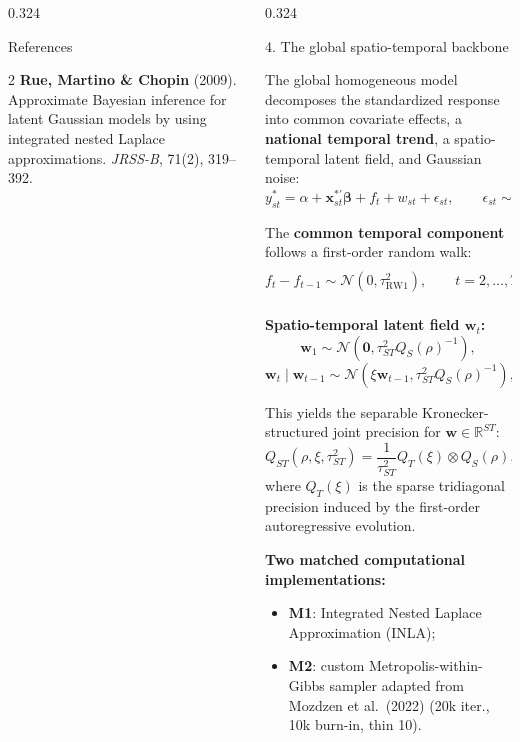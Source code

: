 \documentclass[final]{beamer}
\newcommand{\model}[1]{\textbf{#1}}
\newcommand{\microgap}{\vspace{0.12cm}}
\begin{document}
\begin{frame}[t]
\begin{columns}[t,totalwidth=\textwidth]
\begin{column}{0.324\textwidth}
\begin{block}{References}
\begin{multicols}{2}
\textbf{Rue, Martino \& Chopin} (2009).
Approximate Bayesian inference for latent Gaussian models by using
integrated nested Laplace approximations.
\textit{JRSS-B}, 71(2), 319--392.

\end{multicols}

\end{block}

\end{column}

\begin{column}{0.324\textwidth}
\begin{block}{4. The global spatio-temporal backbone}

The global homogeneous model decomposes the standardized response into
common covariate effects, a \textbf{national temporal trend}, a
spatio-temporal latent field, and Gaussian noise:
\[
y_{st}^*
=
\alpha
+
\mathbf{x}_{st}^{*\prime}\bm{\beta}
+
f_t
+
w_{st}
+
\epsilon_{st},
\qquad
\epsilon_{st}\sim\mathcal{N}(0,\sigma_\epsilon^2).
\]

The \textbf{common temporal component} follows a first-order random walk:
\[
f_t-f_{t-1}
\sim
\mathcal{N}(0,\tau_{\mathrm{RW1}}^2),
\qquad t=2,\ldots,T,
\qquad
\sum_{t=1}^{T}f_t=0.
\]

\microgap
\textbf{Spatio-temporal latent field $\mathbf{w}_t$:}
\[
\mathbf{w}_1
\sim
\mathcal{N}\!\left(
\mathbf{0},
\tau_{ST}^2Q_S(\rho)^{-1}
\right),
\]
\[
\mathbf{w}_t\mid\mathbf{w}_{t-1}
\sim
\mathcal{N}\!\left(
\xi\mathbf{w}_{t-1},
\tau_{ST}^2Q_S(\rho)^{-1}
\right),
\qquad t=2,\ldots,T.
\]

This yields the separable Kronecker-structured joint precision for
$\mathbf{w}\in\mathbb{R}^{ST}$:
\[
Q_{ST}(\rho,\xi,\tau_{ST}^2)
=
\frac{1}{\tau_{ST}^2}
Q_T(\xi)\otimes Q_S(\rho),
\]
where $Q_T(\xi)$ is the sparse tridiagonal precision induced by the first-order autoregressive evolution.


\vspace{0.5cm}
\textbf{Two matched computational implementations:}
\begin{itemize}
  \item \model{M1}: Integrated Nested Laplace Approximation (INLA);
  \item \model{M2}: custom Metropolis-within-Gibbs sampler adapted from
  Mozdzen et al.\ (2022) (20k iter., 10k burn-in, thin 10).
\end{itemize}


\end{block}
\end{column}
\end{columns}
\end{frame}
\end{document}
